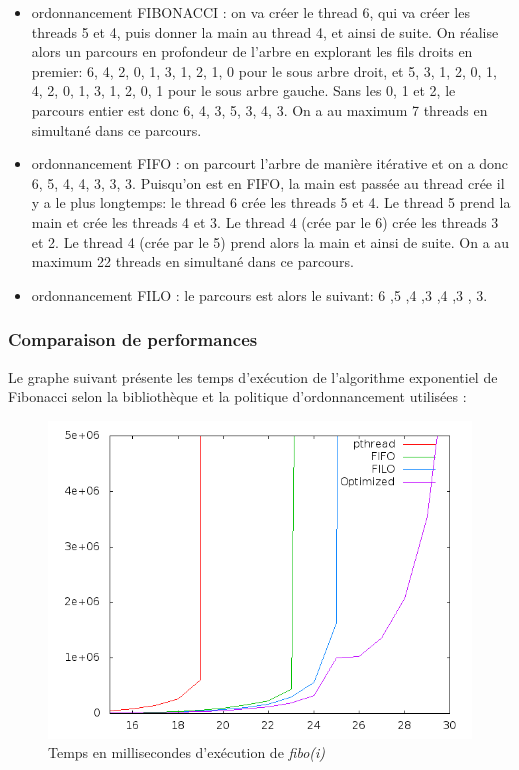 \begin{itemize}
\item ordonnancement FIBONACCI : on va créer le thread 6, qui va créer les threads 5 et 4, puis donner la main au thread 4, et ainsi de suite. On réalise alors un parcours en profondeur de l'arbre en explorant les fils droits en premier: 6, 4, 2, 0, 1, 3, 1, 2, 1, 0 pour le sous arbre droit, et 5, 3, 1, 2, 0, 1, 4, 2, 0, 1, 3, 1, 2, 0, 1 pour le sous arbre gauche. Sans les 0, 1 et 2, le parcours entier est donc 6, 4, 3, 5, 3, 4, 3. On a au maximum 7 threads en simultané dans ce parcours. 
\item ordonnancement FIFO : on parcourt l'arbre de manière itérative et on a donc 6, 5, 4, 4, 3, 3, 3. Puisqu'on est en FIFO, la main est passée au thread crée il y a le plus longtemps: le thread 6 crée les threads 5 et 4. Le thread 5 prend la main et crée les threads 4 et 3. Le thread 4 (crée par le 6) crée les threads 3 et 2. Le thread 4 (crée par le 5) prend alors la main et ainsi de suite. On a au maximum 22 threads en simultané dans ce parcours.
\item ordonnancement FILO : le parcours est alors le suivant: 6 ,5 ,4 ,3 ,4 ,3 , 3.
\end{itemize}

\subsubsection{Comparaison de performances}

Le graphe suivant présente les temps d'exécution de l'algorithme exponentiel de Fibonacci selon la bibliothèque et la politique d'ordonnancement utilisées :

\begin{figure}[h!]
\includegraphics[width=\textwidth]{img/graph_comparaison}
\caption{Temps en millisecondes d'exécution de \textit{fibo(i)}}
\end{figure}

